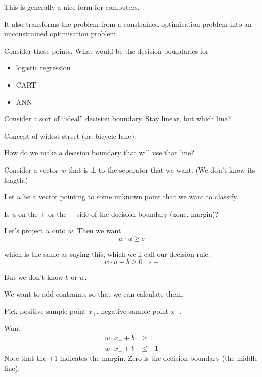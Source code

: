This is generally a nice form for computers.

It also transforms the problem from a constrained optimisation
problem into an unconstrained optimisation problem.



Consider these points.  What would be the decision boundaries for
\begin{itemize}
\item logistic regression
\item CART
\item ANN
\end{itemize}

\centerline{}

\bigskip

Consider a sort of ``ideal'' decision boundary.  Stay linear, but
which line?

Concept of widest street (or: bicycle lane).

How do we make a decision boundary that will use that line?

\bigskip
\centerline{}
\bigskip

Consider a vector $w$ that is $\bot$ to the separator that we want.
(We don't know its length.)

Let $u$ be a vector pointing to some unknown point that we want to
classify.

Is $u$ on the $+$ or the $-$ side of the decision boundary (zone, margin)?

Let's project $u$ onto $w$.  Then we want
\begin{displaymath}
  w\cdot u \ge c
\end{displaymath}

which is the same as saying this, which we'll call our decision rule:
\begin{equation}
  \label{eq:decision-rule}
  \boxed{w\cdot u + b \ge 0 \Rightarrow +}
\end{equation}

But we don't know $b$ or $w$.

We want to add contraints so that we can calculate them.

Pick positive sample point $x_+$, negative sample point $x_-$.

Want
\begin{align*}
  w\cdot x_+ + b & \ge 1
  \\
  w\cdot x_- + b & \le -1
\end{align*}
Note that the $\pm 1$ indicates the margin.  Zero is the decision
boundary (the middle line).

